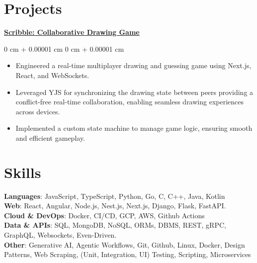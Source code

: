 \documentclass[10pt, letterpaper]{article}
\newenvironment{highlights}{
    \begin{itemize}[
        topsep=0.10 cm,
        parsep=0.10 cm,
        partopsep=0pt,
        itemsep=0pt,
        leftmargin=0 cm + 10pt
    ]
}{
    \end{itemize}
} %
\newenvironment{onecolentry}{
    \begin{adjustwidth}{
        0 cm + 0.00001 cm
    }{
        0 cm + 0.00001 cm
    }
}{
    \end{adjustwidth}
} %
\begin{document}
\section{Projects}
\textbf{\href{https://github.com/elweday1/scribble}{Scribble: Collaborative Drawing Game}}
\vspace{0.10 cm}
\begin{onecolentry}
    \begin{highlights}
        \item Engineered a real-time multiplayer drawing and guessing game using Next.js, React, and WebSockets.
        \item Leveraged YJS for synchronizing the drawing state between peers providing a conflict-free real-time collaboration, enabling seamless drawing experiences across devices.
        \item Implemented a custom state machine to manage game logic, ensuring smooth and efficient gameplay.
    \end{highlights}
\end{onecolentry}

\section{Skills}
\textbf{Languages}{: JavaScript, TypeScript, Python, Go, C, C++, Java, Kotlin} \\ \vspace{0.2 cm}
\textbf{Web}{: React, Angular, Node.js, Nest.js, Next.js, Django, Flask, FastAPI.} \\ \vspace{0.2 cm}
\textbf{Cloud \& DevOps}{: Docker, CI/CD, GCP, AWS, Github Actions} \\ \vspace{0.2 cm}
\textbf{Data \& APIs}{: SQL, MongoDB, NoSQL, ORMs, DBMS, REST, gRPC, GraphQL, Websockets, Even-Driven.} \\ \vspace{0.2 cm}
\textbf{Other}{: Generative AI, Agentic Workflows, Git, Github, Linux, Docker, Design Patterns, Web Scraping, (Unit, Integration, UI) Testing, Scripting, Microservices} \\ \vspace{0.2 cm}
\end{document}
